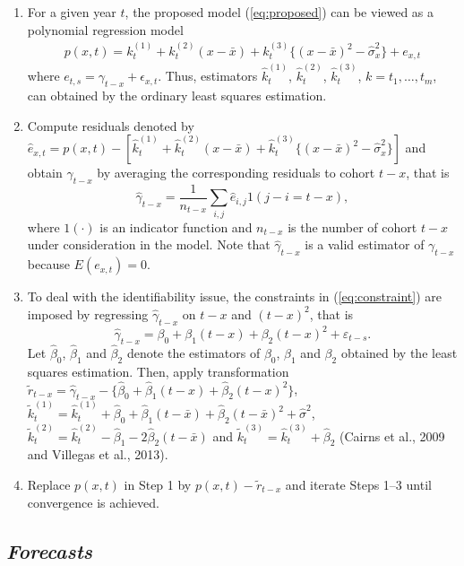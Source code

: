 \documentclass[11pt,letterpaper]{article}
\numberwithin{equation}{section}
\begin{document}
\begin{enumerate}
\item  For a given year $t$, the proposed model (\ref{eq:proposed}) can be viewed as a polynomial regression model
\begin{eqnarray*}
p(x,t)=k_t^{(1)}+ k_t^{(2)}(x - \bar{x}) + k_t^{(3)}\{(x - \bar{x})^{2} - \hat\sigma_x^{2}\} +e_{x,t}
\end{eqnarray*}
where $e_{t,s}=\gamma_{t-x}+\epsilon_{x,t}$.   Thus, estimators $\hat{k}_t^{(1)}$, $\hat{k}_t^{(2)}$, $\hat{k}_t^{(3)}$, $k=t_1,\dots,t_m$, can obtained by the ordinary least squares estimation.

\item Compute residuals denoted by $\hat{e}_{x,t}=p(x,t)-[\hat{k}_t^{(1)}+ \hat{k}_t^{(2)}(x - \bar{x}) + \hat{k}_t^{(3)}\{(x - \bar{x})^{2} - \hat\sigma_x^{2}\}]$ and obtain $\hat\gamma_{t-x}$ by averaging the corresponding residuals to cohort $t-x$, that is
$$
\hat\gamma_{t-x}=\frac{1}{n_{t-x}}\sum_{i,j}\hat{e}_{i,j}1(j-i=t-x),
$$
where $1(\cdot)$ is an indicator function and $n_{t-x}$ is the number of cohort $t-x$  under consideration in the model.  Note that $\hat\gamma_{t-x}$ is a valid estimator of   $\gamma_{t-x}$ because $E(e_{x,t})=0$.

\item To deal with the identifiability issue, the constraints in (\ref{eq:constraint}) are imposed by regressing  $\hat{\gamma}_{t-x}$ on $t-x$ and $(t-x)^2$, that is
$$
\hat{\gamma}_{t-x}=\beta_0+\beta_1(t-x)+\beta_2(t-x)^2+\varepsilon_{t-s}.
$$
Let  $\hat\beta_0$, $\hat\beta_1$ and  $\hat\beta_2$ denote  the estimators of $\beta_0$, $\beta_1$ and  $\beta_2$ obtained by the least squares estimation. Then, apply transformation $\tilde{r}_{t-x}=\hat{\gamma}_{t-x}-\{\hat\beta_0+\hat\beta_1(t-x)+\hat{\beta}_2(t-x)^2\}$, $\tilde{k}_t^{(1)}=\hat{k}_t^{(1)}+\hat\beta_0+\hat\beta_1(t-\bar{x})+\hat{\beta}_2(t-\bar{x})^2+\hat{\sigma}^2$,  $\tilde{k}_t^{(2)}=\hat{k}_t^{(2)}-\hat\beta_1-2\hat\beta_2(t-\bar{x})$  and  $\tilde{k}_t^{(3)}=\hat{k}_t^{(3)}+\hat\beta_2$ (Cairns et al., 2009 and Villegas et al., 2013).
\item Replace $p(x,t)$ in Step 1 by $p(x,t)-\tilde{r}_{t-x}$ and  iterate Steps 1--3 until convergence is achieved.
\end{enumerate}

\subsection{\textit{Forecasts}}
\end{document}
